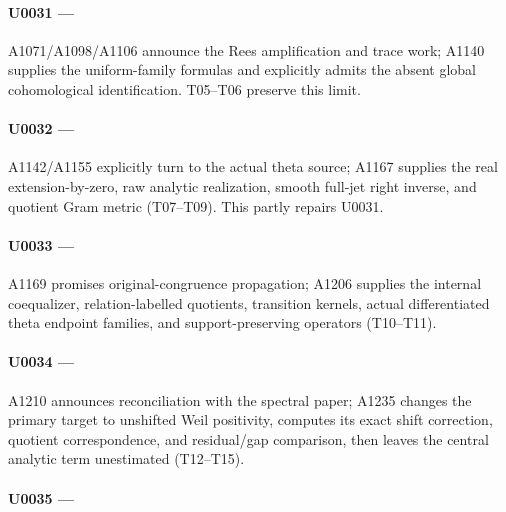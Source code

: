 \paragraph{\texorpdfstring{U0031 ---
\protect{}}{U0031 --- }}\label{u0031-fd1d4ef4-537b-4bca-8d5b-0cb82a441737}

A1071/A1098/A1106 announce the Rees amplification and trace work; A1140
supplies the uniform-family formulas and explicitly admits the absent
global cohomological identification. T05--T06 preserve this limit.

\paragraph{\texorpdfstring{U0032 ---
\protect{}}{U0032 --- }}\label{u0032-f4609209-f2cd-4dbc-8ec2-a8995aedc998}

A1142/A1155 explicitly turn to the actual theta source; A1167 supplies
the real extension-by-zero, raw analytic realization, smooth full-jet
right inverse, and quotient Gram metric (T07--T09). This partly repairs
U0031.

\paragraph{\texorpdfstring{U0033 ---
\protect{}}{U0033 --- }}\label{u0033-622780af-97a6-4c56-987c-135df8409461}

A1169 promises original-congruence propagation; A1206 supplies the
internal coequalizer, relation-labelled quotients, transition kernels,
actual differentiated theta endpoint families, and support-preserving
operators (T10--T11).

\paragraph{\texorpdfstring{U0034 ---
\protect{}}{U0034 --- }}\label{u0034-b5ee7e11-a089-4433-af7a-ede73bbc5bcf}

A1210 announces reconciliation with the spectral paper; A1235 changes
the primary target to unshifted Weil positivity, computes its exact
shift correction, quotient correspondence, and residual/gap comparison,
then leaves the central analytic term unestimated (T12--T15).

\paragraph{\texorpdfstring{U0035 ---
\protect{}}{U0035 --- }}\label{u0035-7b9f7612-3a57-4687-9bfb-39d1d933baf8}

